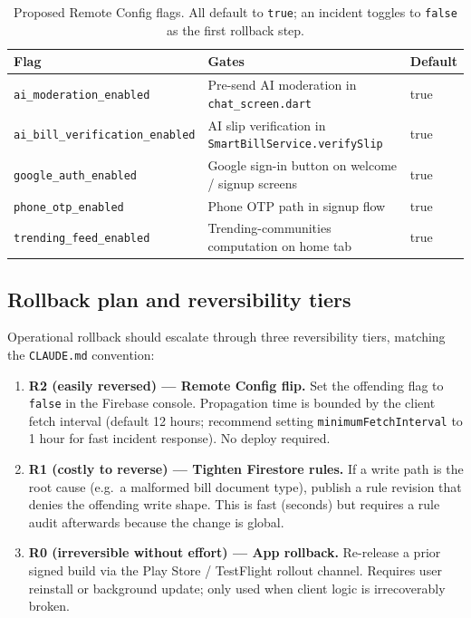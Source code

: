 \documentclass[11pt,a4paper]{article}
\renewcommand{\arraystretch}{1.05}
\begin{document}
\begin{table}[h]
\centering\small
\renewcommand{\arraystretch}{1.1}
\begin{tabularx}{\linewidth}{@{}lXl@{}}
\toprule
\textbf{Flag} & \textbf{Gates} & \textbf{Default} \\
\midrule
\texttt{ai\_moderation\_enabled}         & Pre-send AI moderation in \texttt{chat\_screen.dart}      & true  \\
\texttt{ai\_bill\_verification\_enabled} & AI slip verification in \texttt{SmartBillService.verifySlip} & true  \\
\texttt{google\_auth\_enabled}           & Google sign-in button on welcome / signup screens         & true  \\
\texttt{phone\_otp\_enabled}             & Phone OTP path in signup flow                              & true  \\
\texttt{trending\_feed\_enabled}         & Trending-communities computation on home tab               & true  \\
\bottomrule
\end{tabularx}
\caption{Proposed Remote Config flags. All default to \texttt{true}; an
incident toggles to \texttt{false} as the first rollback step.}
\end{table}

\subsection{Rollback plan and reversibility tiers}

Operational rollback should escalate through three reversibility tiers,
matching the \texttt{CLAUDE.md} convention:

\begin{enumerate}[leftmargin=*,nosep]
  \item \textbf{R2 (easily reversed) --- Remote Config flip.} Set the
        offending flag to \texttt{false} in the Firebase console.
        Propagation time is bounded by the client fetch interval (default
        12 hours; recommend setting \texttt{minimumFetchInterval} to 1
        hour for fast incident response). No deploy required.
  \item \textbf{R1 (costly to reverse) --- Tighten Firestore rules.} If
        a write path is the root cause (e.g.\ a malformed bill document
        type), publish a rule revision that denies the offending write
        shape. This is fast (seconds) but requires a rule audit afterwards
        because the change is global.
  \item \textbf{R0 (irreversible without effort) --- App rollback.}
        Re-release a prior signed build via the Play Store /
        TestFlight rollout channel. Requires user reinstall or
        background update; only used when client logic is irrecoverably
        broken.
\end{enumerate}
\end{document}
